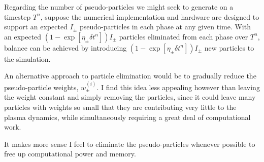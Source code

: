     \shortline

    Regarding the number of pseudo-particles we might seek to generate on a timestep $T^{n}$, suppose the numerical implementation and hardware are designed to support an expected $I_{\pm}$ pseudo-particles in each phase at any given time. With an expected $(1 - \exp\left[\eta_{\pm}\delta t^{n}\right])I_{\pm}$ particles eliminated from each phase over $T^{n}$, balance can be achieved by introducing $(1 - \exp\left[\eta_{\pm}\delta t^{n}\right])I_{\pm}$ new particles to the simulation.

    \shortline

    \begin{remark}
        An alternative approach to particle elimination would be to gradually reduce the pseudo-particle weights, $w_{\pm}^{(i)}$. I find this idea less appealing however than leaving the weight constant and simply removing the particles, since it could leave many particles with weights so small that they are contributing very little to the plasma dynamics, while simultaneously requiring a great deal of computational work.
        
        It makes more sense I feel to eliminate the pseudo-particles whenever possible to free up computational power and memory.
    \end{remark}
    